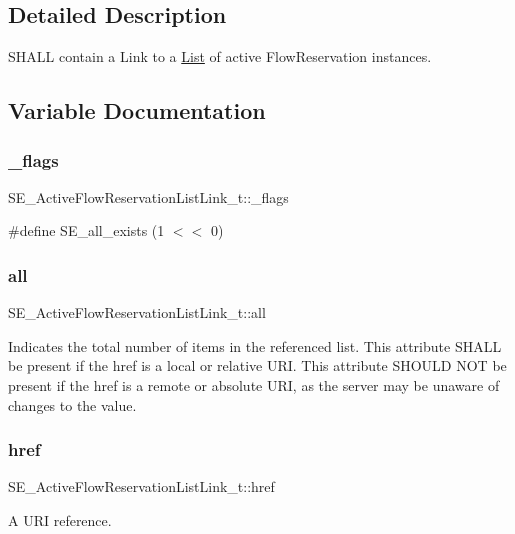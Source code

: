 \subsection{Detailed Description}
S\+H\+A\+LL contain a Link to a \hyperlink{structList}{List} of active Flow\+Reservation instances. 

\subsection{Variable Documentation}
\mbox{\label{group__ActiveFlowReservationListLink_gab04404a94a50dffbb0d4c65ca0b01082}} 
\subsubsection{\texorpdfstring{\+\_\+flags}{\_flags}}
{\footnotesize\ttfamily S\+E\+\_\+\+Active\+Flow\+Reservation\+List\+Link\+\_\+t\+::\+\_\+flags}

\#define S\+E\+\_\+all\+\_\+exists (1 $<$$<$ 0) \mbox{\label{group__ActiveFlowReservationListLink_gadf239f5f9855c67204029ef9589feced}} 
\subsubsection{\texorpdfstring{all}{all}}
{\footnotesize\ttfamily S\+E\+\_\+\+Active\+Flow\+Reservation\+List\+Link\+\_\+t\+::all}

Indicates the total number of items in the referenced list. This attribute S\+H\+A\+LL be present if the href is a local or relative U\+RI. This attribute S\+H\+O\+U\+LD N\+OT be present if the href is a remote or absolute U\+RI, as the server may be unaware of changes to the value. \mbox{\label{group__ActiveFlowReservationListLink_ga6b547f1f9bca676a3c9115adbaf2366f}} 
\subsubsection{\texorpdfstring{href}{href}}
{\footnotesize\ttfamily S\+E\+\_\+\+Active\+Flow\+Reservation\+List\+Link\+\_\+t\+::href}

A U\+RI reference. 